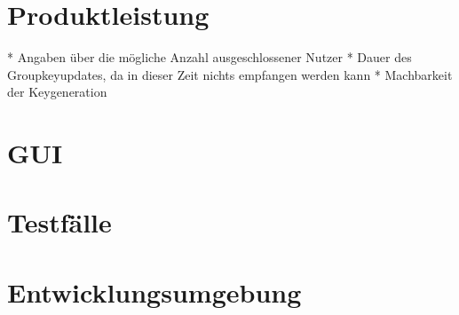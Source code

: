 \documentclass[a4paper,10pt]{article}
\begin{document}
\section{Produktleistung}
* Angaben über die mögliche Anzahl ausgeschlossener Nutzer
* Dauer des Groupkeyupdates, da in dieser Zeit nichts empfangen werden kann
* Machbarkeit der Keygeneration

\section{GUI}

\section{Testfälle}

\section{Entwicklungsumgebung}

\clearpage


{}

\end{document}
